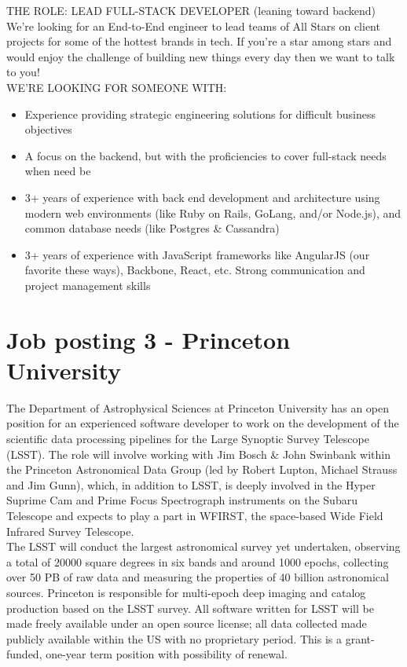 THE ROLE: LEAD FULL-STACK DEVELOPER (leaning toward backend)\\

We're looking for an End-to-End engineer to lead teams of All Stars on client projects for some of the hottest brands in tech. If you're a star among stars and would enjoy the challenge of building new things every day then we want to talk to you!\\

\noindent WE'RE LOOKING FOR SOMEONE WITH:
\begin{itemize}
\item Experience providing strategic engineering solutions for difficult business objectives
\item A focus on the backend, but with the proficiencies to cover full-stack needs when need be
\item 3+ years of experience with back end development and architecture using modern web environments (like Ruby on Rails, GoLang, and/or Node.js), and common database needs (like Postgres \& Cassandra)
\item 3+ years of experience with JavaScript frameworks like AngularJS (our favorite these ways), Backbone, React, etc. Strong communication and project management skills
\end{itemize}

\section{Job posting 3 - Princeton University}\label{sec:job-posting-three}
The Department of Astrophysical Sciences at Princeton University has an open position for an experienced software developer to work on the development of the scientific data processing pipelines for the Large Synoptic Survey Telescope (LSST). The role will involve working with Jim Bosch \& John Swinbank within the Princeton Astronomical Data Group (led by Robert Lupton, Michael Strauss and Jim Gunn), which, in addition to LSST, is deeply involved in the Hyper Suprime Cam and Prime Focus Spectrograph instruments on the Subaru Telescope and expects to play a part in WFIRST, the space-based Wide Field Infrared Survey Telescope.\\

The LSST will conduct the largest astronomical survey yet undertaken, observing a total of 20000 square degrees in six bands and around 1000 epochs, collecting over 50 PB of raw data and measuring the properties of 40 billion astronomical sources. Princeton is responsible for multi-epoch deep imaging and catalog production based on the LSST survey. All software written for LSST will be made freely available under an open source license; all data collected made publicly available within the US with no proprietary period. This is a grant-funded, one-year term position with possibility of renewal.\\

